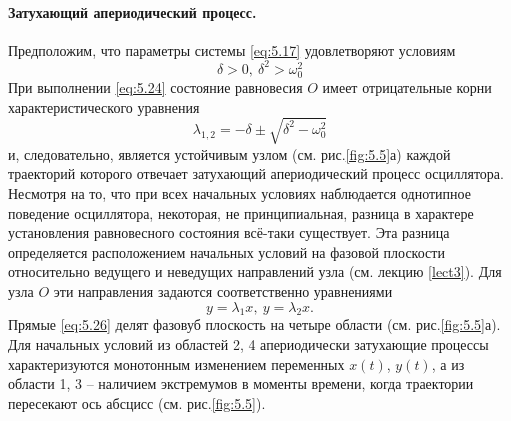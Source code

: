 \paragraph{Затухающий апериодический процесс.}%
\label{par:zatukhaiushchii_aperiodicheskii_protsess_}

Предположим, что параметры системы \eqref{eq:5.17} удовлетворяют условиям
\begin{equation}
        \label{eq:5.24}
        \delta>0,~ \delta^2 > \omega_0^2
\end{equation}
При выполнении \eqref{eq:5.24} состояние равновесия $O$ имеет отрицательные корни характеристического уравнения
\begin{equation}
        \label{eq:5.25}
        \lambda_{1,2} = - \delta \pm \sqrt{ \delta^2 - \omega_0^2}
\end{equation}
и, следовательно, является устойчивым узлом (см. рис.\ref{fig:5.5}а) каждой траекторий которого отвечает затухающий апериодический процесс осциллятора. Несмотря на то, что при всех начальных условиях наблюдается однотипное поведение осциллятора, некоторая, не принципиальная, разница в характере установления равновесного состояния всё-таки существует. Эта разница определяется расположением начальных условий на фазовой плоскости относительно 
ведущего и неведущих направлений узла (см. лекцию \ref{lect3}). Для узла $O$ эти направления задаются соответственно уравнениями
\begin{equation}
        \label{eq:5.26}
        y= \lambda_1 x, ~ y=\lambda_2 x.
\end{equation}
Прямые \eqref{eq:5.26} делят фазовуб плоскость на четыре области (см. рис.\ref{fig:5.5}а). Для начальных условий из областей 2, 4 апериодически затухающие процессы характеризуются монотонным изменением переменных $x(t)$, $y(t)$, а из области 1, 3 -- наличием экстремумов в моменты времени, когда траектории пересекают ось абсцисс (см. рис.\ref{fig:5.5}). 
